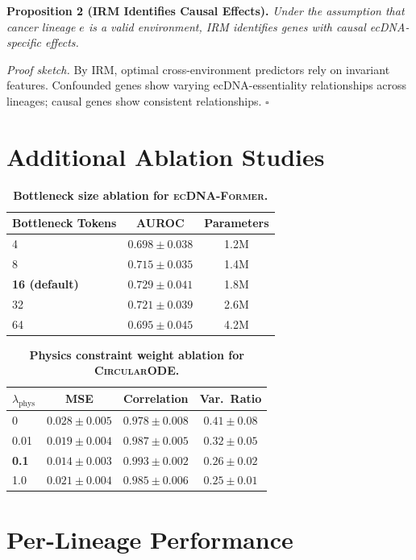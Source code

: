 \documentclass[runningheads]{llncs}
\newcommand{\former}{\textsc{ecDNA-Former}}
\newcommand{\circularode}{\textsc{CircularODE}}
\begin{document}
\textbf{Proposition 2 (IRM Identifies Causal Effects).} \textit{Under the assumption that cancer lineage $e$ is a valid environment, IRM identifies genes with causal ecDNA-specific effects.}

\textit{Proof sketch.} By IRM, optimal cross-environment predictors rely on invariant features. Confounded genes show varying ecDNA-essentiality relationships across lineages; causal genes show consistent relationships. $\square$


\section{Additional Ablation Studies}
\label{app:ablations}

\begin{table}[h]
\caption{\textbf{Bottleneck size ablation for \former{}.}}
\centering
\footnotesize
\begin{tabular}{@{}lcc@{}}
\toprule
Bottleneck Tokens & AUROC & Parameters \\
\midrule
4 & $0.698 \pm 0.038$ & 1.2M \\
8 & $0.715 \pm 0.035$ & 1.4M \\
\textbf{16 (default)} & $\mathbf{0.729 \pm 0.041}$ & 1.8M \\
32 & $0.721 \pm 0.039$ & 2.6M \\
64 & $0.695 \pm 0.045$ & 4.2M \\
\bottomrule
\end{tabular}
\end{table}

\begin{table}[h]
\caption{\textbf{Physics constraint weight ablation for \circularode{}.}}
\centering
\footnotesize
\begin{tabular}{@{}lccc@{}}
\toprule
$\lambda_{\text{phys}}$ & MSE & Correlation & Var.\ Ratio \\
\midrule
0 & $0.028 \pm 0.005$ & $0.978 \pm 0.008$ & $0.41 \pm 0.08$ \\
0.01 & $0.019 \pm 0.004$ & $0.987 \pm 0.005$ & $0.32 \pm 0.05$ \\
\textbf{0.1} & $\mathbf{0.014 \pm 0.003}$ & $\mathbf{0.993 \pm 0.002}$ & $\mathbf{0.26 \pm 0.02}$ \\
1.0 & $0.021 \pm 0.004$ & $0.985 \pm 0.006$ & $0.25 \pm 0.01$ \\
\bottomrule
\end{tabular}
\end{table}


\section{Per-Lineage Performance}
\label{app:lineage}
\end{document}
